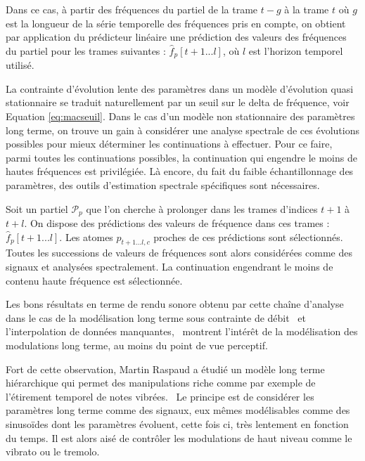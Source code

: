 Dans ce cas, à partir des fréquences du partiel de la trame $t-g$ à la trame $t$ où $g$ est la longueur de la série temporelle des fréquences pris en compte, on obtient par application du prédicteur linéaire une prédiction des valeurs des fréquences du partiel pour les trames suivantes : $\hat{f}_{p}[t+1...l]$, où $l$ est l'horizon temporel utilisé.

La contrainte d'évolution lente des paramètres dans un modèle d'évolution quasi stationnaire se traduit naturellement par un seuil sur le delta de fréquence, voir Equation \ref{eq:macseuil}. Dans le cas d'un modèle non stationnaire des paramètres long terme, on trouve un gain à considérer une analyse spectrale de ces évolutions possibles pour mieux déterminer les continuations à effectuer. Pour ce faire, parmi toutes les continuations possibles, la continuation qui engendre le moins de hautes fréquences est privilégiée. Là encore, du fait du faible échantillonnage des paramètres, des outils d'estimation spectrale spécifiques sont nécessaires.

Soit un partiel $\mathcal{P}_{p}$ que l'on cherche à prolonger dans les trames d'indices $t+1$ à $t+l$. On dispose des prédictions des valeurs de fréquence dans ces trames : $\hat{f}_{p}[t+1...l]$. Les atomes $p_{t+1...l, c}$ proches de ces prédictions sont sélectionnés. Toutes les successions de valeurs de fréquences sont alors considérées comme des signaux et analysées spectralement. La continuation engendrant le moins de contenu haute fréquence est sélectionnée.


Les bons résultats en terme de rendu sonore obtenu par cette chaîne d'analyse dans le cas  de la modélisation long terme sous contrainte de débit~\cite{lagrangeTaslp06} et l'interpolation de données manquantes,~\cite{lagrangeJaes05} montrent l'intérêt de la modélisation des modulations long terme, au moins du point de vue perceptif.

Fort de cette observation, Martin Raspaud a étudié un modèle long terme hiérarchique qui permet des manipulations riche comme par exemple de l'étirement temporel de notes vibrées.~\cite{raspaud2007modeles} Le principe est de considérer les paramètres long terme comme des signaux, eux mêmes modélisables comme des sinusoïdes dont les paramètres évoluent, cette fois ci, très lentement en fonction du temps. Il est alors aisé de contrôler les modulations de haut niveau comme le vibrato ou le tremolo.




